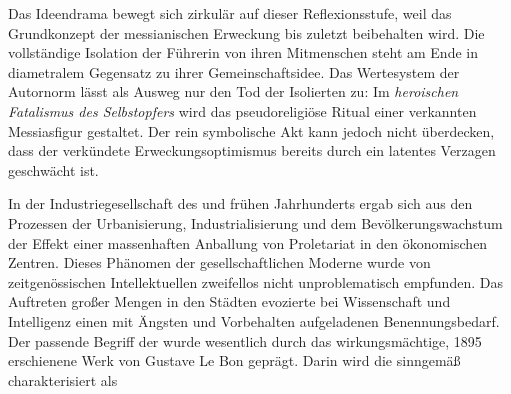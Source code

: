 Das Ideendrama \Cite{Masse Mensch} bewegt sich zirkulär auf dieser
Reflexionsstufe, weil das
Grundkonzept der messianischen Erweckung bis zuletzt beibehalten wird.
Die vollständige Isolation der Führerin von ihren Mitmenschen steht am Ende in
diametralem Gegensatz zu ihrer Gemeinschaftsidee.  
Das Wertesystem der Autornorm lässt als Ausweg nur den Tod der Isolierten zu:
Im \emph{heroischen Fatalismus des Selbstopfers} wird das pseudoreligiöse
Ritual einer verkannten Messiasfigur gestaltet. Der rein symbolische Akt kann
jedoch nicht überdecken, dass der verkündete Erweckungsoptimismus bereits
durch ein latentes Verzagen geschwächt ist.


In der Industriegesellschaft des  und frühen  Jahrhunderts
ergab sich aus den Prozessen der Urbanisierung, Industrialisierung und dem
Bevölkerungswachstum der Effekt einer massenhaften Anballung von Proletariat
in den ökonomischen Zentren.
Dieses Phänomen der gesellschaftlichen Moderne
wurde von zeitgenössischen Intellektuellen zweifellos nicht unproblematisch
empfunden. Das Auftreten großer Mengen  in den Städten
evozierte bei Wissenschaft und Intelligenz einen mit Ängsten und Vorbehalten
aufgeladenen Benennungsbedarf. Der passende Begriff der \Cite{Masse} wurde
wesentlich durch das wirkungsmächtige, 1895 erschienene Werk 
\Cite{Psychologie des Foules} von Gustave Le Bon geprägt.  
Darin wird die \Cite{Masse} sinngemäß charakterisiert als \Cite{ungestaltes,
  furchterregendes Wesen, das
  aus dem Schoß der Geschichte aufstieg und ihren Gang verhängnisvoll zu
  beeinflussen drohte.}

